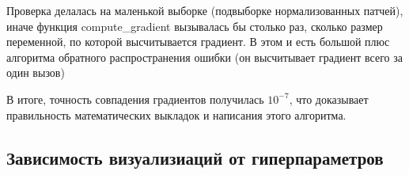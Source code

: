 \documentclass[12pt, a4paper]{article}
\begin{document}
			Проверка делалась на маленькой выборке (подвыборке нормализованных патчей), иначе функция compute\_gradient вызывалась бы столько раз, сколько размер переменной, по которой высчитывается градиент. В этом и есть большой плюс алгоритма обратного распространения ошибки (он высчитывает градиент всего за один вызов)

			В итоге, точность совпадения градиентов получилась $10^{-7}$, что доказывает правильность математических выкладок и написания этого алгоритма.
		
		\newpage
		\subsection{Зависимость визуализиаций от гиперпараметров} \label{sssec:p3}
\end{document}
